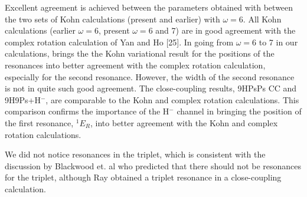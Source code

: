 \documentclass[preprint,showpacs,preprintnumbers,amsmath,amssymb]{revtex4}
\begin{document}
Excellent agreement is achieved between the
parameters obtained with between the two sets
of Kohn calculations (present and earlier) with
$\omega =6$.
All Kohn calculations (earlier $\omega=6$, present $\omega=6$ and 7)
are in good agreement with the complex rotation calculation
of Yan and Ho [25].
In going from $\omega=6$ to 7 in our calculations, brings the 
the Kohn variational result for the positions
of the resonances into better agreement with
the complex rotation calculation, especially 
for the second resonance.
However, the width of the second resonance is not
in quite such good agreement.
The close-coupling results, 9HPsPs CC and 9H9Ps+H$^-$,
are comparable to the Kohn and complex rotation calculations.
This comparison confirms the importance of the H$^-$
channel in bringing the position of the first resonance,
$^1E_R$, into better agreement with the Kohn
and complex rotation calculations.

We did not notice resonances in the triplet, which
is consistent with the discussion by Blackwood et. al
who predicted that there should not be resonances
for the triplet,  although Ray obtained a triplet resonance
in a close-coupling calculation.
\end{document}
